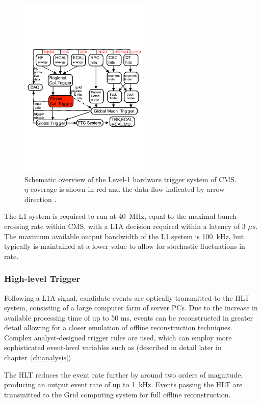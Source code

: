 \begin{figure}[ht!]
  \centering
  \includegraphics[width = 0.55\textwidth]{Figs/machine/L1_diagram.pdf}
  \caption{Schematic overview of the Level-1 hardware trigger system of CMS. $
  \eta$ coverage is shown in red and the data-flow indicated by arrow 
  direction \cite{tridasTDR}.}
  \label{fig:l1_diagram}
\end{figure}

The L1 system is required to run at 40~MHz, equal to the maximal bunch-crossing
rate within CMS, with a L1A decision required within a latency of 3 $\mu s$. The
maximum available output bandwidth of the L1 system is 100~kHz, but typically is
maintained at a lower value to allow for stochastic fluctuations in rate.

\subsubsection{High-level Trigger}

Following a L1A signal, candidate events are optically transmitted to the HLT 
system, consisting of a large computer farm of server 
PCs. Due to the increase in available processing time of up to 50 ms, events can
be reconstructed in greater detail allowing for a closer emulation of offline 
reconstruction techniques. Complex analyst-designed trigger rules are used, 
which can employ more sophisticated event-level variables such as \alphat
(described in detail later in chapter~\ref{ch:analysis}).

The HLT reduces the event rate further by around two orders of magnitude,
producing an output event rate of up to 1~kHz. Events passing the HLT are
transmitted to the Grid computing system \cite{Eck:840543} for full offline
reconstruction.
